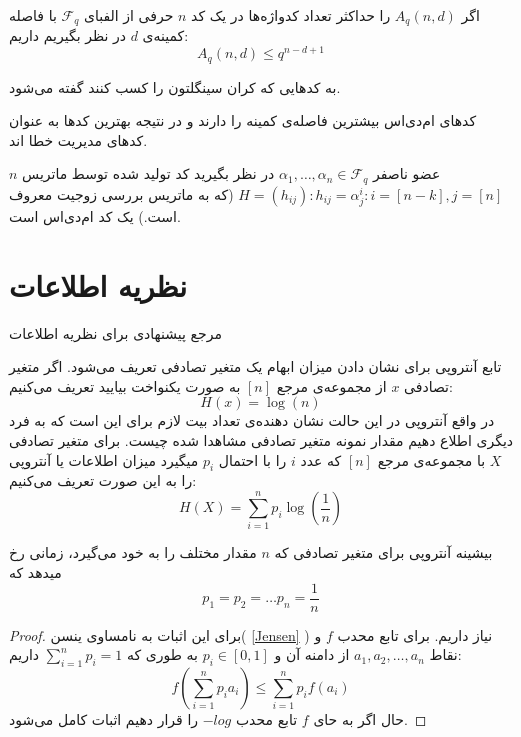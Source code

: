 \begin{definition}
	اگر
	$A_q(n, d)$
	را حداکثر تعداد کدواژه‌ها در یک کد
	$n$
	حرفی از الفبای
	$\mathcal{F}_q$
	با فاصله کمینه‌ی 
	$d$
	در نظر بگیریم داریم:
	\begin{equation}
		A_q(n, d) \leq q^{n - d + 1}
	\end{equation}
	\cite{wiki:Singleton}
\end{definition}
\begin{definition}
	\label{def:mds}
	به کدهایی که کران سینگلتون را کسب کنند گفته می‌شود.
\end{definition}

کدهای ام‌دی‌اس بیشترین فاصله‌ی کمینه را دارند و در نتیجه بهترین کدها به عنوان کدهای مدیریت خطا اند.
\begin{example}
	$n$
	عضو ناصفر
	$\alpha_1, \ldots, \alpha_n \in \mathcal{F}_q$
	در نظر بگیرید کد تولید شده توسط ماتریس 
	$H = (h_{ij}): h_{ij} = \alpha_j^i: i = [n - k], j = [n]$
	(که به ماتریس  بررسی زوجیت معروف است.)	یک کد ام‌دی‌اس است.
\end{example}
\section{
    ‌نظریه اطلاعات
}
مرجع پیشنهادی برای نظریه اطلاعات
\cite{book:info}

تابع آنتروپی برای نشان دادن میزان ابهام یک متغیر تصادفی تعریف می‌شود. اگر متغیر تصادفی
$x$
از مجموعه‌ی مرجع
$[n]$
به صورت یکنواخت بیایید تعریف می‌کنیم:
$$H(x) = \log(n)$$
در واقع آنتروپی در این حالت نشان دهنده‌ی تعداد بیت لازم برای این است که به فرد دیگری اطلاع دهیم مقدار نمونه متغیر تصادفی مشاهدا شده چیست. برای متغیر تصادفی
$X$
با مجموعه‌ی مرجع
$[n]$
که عدد
$i$
را با احتمال
$p_i$
میگیرد میزان اطلاعات یا آنتروپی را به این صورت تعریف می‌کنیم:
$$H(X) = \sum_{i = 1}^{n} p_i \log(\frac{1}{n})$$

\begin{theorem}
بیشینه آنتروپی برای متغیر تصادفی که
$n$
مقدار مختلف را به خود می‌گیرد، زمانی رخ میدهد که
$$p_1 = p_2 = \dots p_n = \frac{1}{n}$$
\end{theorem}
\begin{proof}
برای این اثبات به نامساوی ینسن(
\autoref{Jensen}
)
 نیاز داریم. برای تابع محدب
$f$
و نقاط
$a_1, a_2, \dots, a_n$
از دامنه آن و
$p_i \in [0, 1]$
به طوری که
$\sum_{i = 1}^{n} p_i = 1$
داریم:
$$f(\sum_{i = 1}^{n} p_i a_i) \leq \sum_{i = 1}^{n} p_i f(a_i)$$
حال اگر به حای
$f$
تابع محدب
$- log$
را قرار دهیم اثبات کامل می‌شود.
\end{proof}

